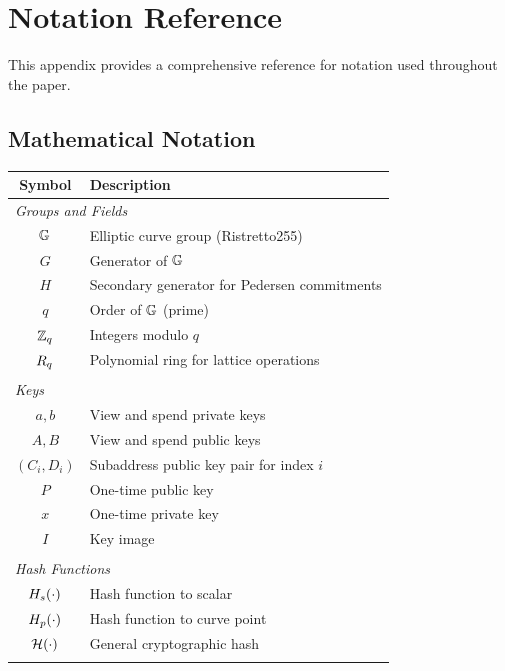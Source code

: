 
\section{Notation Reference}
\label{app:notation}

This appendix provides a comprehensive reference for notation used
throughout the paper.

\subsection{Mathematical Notation}

\begin{longtable}{@{}cl@{}}
\toprule
\textbf{Symbol} & \textbf{Description} \\
\midrule
\endhead

\multicolumn{2}{l}{\textit{Groups and Fields}} \\
$\mathbb{G}$ & Elliptic curve group (Ristretto255) \\
$G$ & Generator of $\mathbb{G}$ \\
$H$ & Secondary generator for Pedersen commitments \\
$q$ & Order of $\mathbb{G}$ (prime) \\
$\mathbb{Z}_q$ & Integers modulo $q$ \\
$R_q$ & Polynomial ring for lattice operations \\
\\

\multicolumn{2}{l}{\textit{Keys}} \\
$a, b$ & View and spend private keys \\
$A, B$ & View and spend public keys \\
$(C_i, D_i)$ & Subaddress public key pair for index $i$ \\
$P$ & One-time public key \\
$x$ & One-time private key \\
$I$ & Key image \\
\\

\multicolumn{2}{l}{\textit{Hash Functions}} \\
$H_s(\cdot)$ & Hash function to scalar \\
$H_p(\cdot)$ & Hash function to curve point \\
$\mathcal{H}(\cdot)$ & General cryptographic hash \\
\\


\end{longtable}
